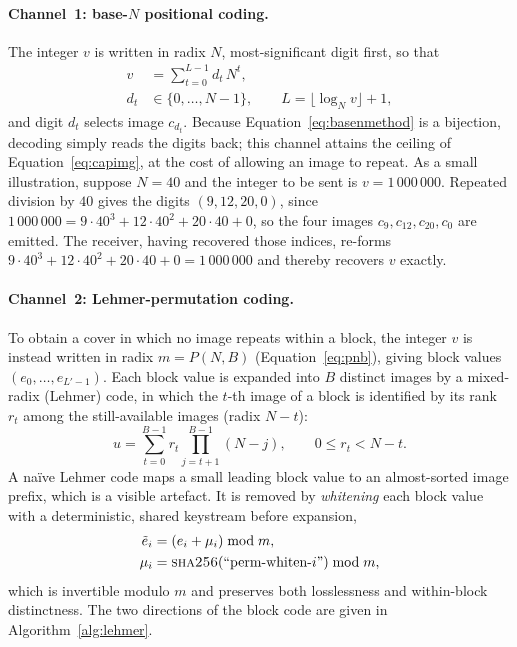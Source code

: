 \documentclass[10pt,a4paper]{article}
\theoremstyle{definition}
\begin{document}
\paragraph{Channel~1: base-$N$ positional coding.}
The integer $v$ is written in radix $N$, most-significant digit first, so that
\begin{equation}
  \begin{aligned}
  v&=\sum_{t=0}^{L-1} d_t\,N^{t},\\
  d_t&\in\{0,\dots,N-1\},\qquad L=\lfloor\log_N v\rfloor+1 ,
  \end{aligned}
  \label{eq:basenmethod}
\end{equation}
and digit $d_t$ selects image $c_{d_t}$. Because Equation~\eqref{eq:basenmethod} is a
bijection, decoding simply reads the digits back; this channel attains the ceiling
of Equation~\eqref{eq:capimg}, at the cost of allowing an image to repeat. As a small
illustration, suppose $N=40$ and the integer to be sent is $v=1\,000\,000$. Repeated
division by $40$ gives the digits $(9,12,20,0)$, since
$1\,000\,000 = 9\cdot40^{3} + 12\cdot40^{2} + 20\cdot40 + 0$, so the four images
$c_9,c_{12},c_{20},c_0$ are emitted. The receiver, having recovered those indices,
re-forms $9\cdot40^{3}+12\cdot40^{2}+20\cdot40+0=1\,000\,000$ and thereby recovers
$v$ exactly.

\paragraph{Channel~2: Lehmer-permutation coding.}
To obtain a cover in which no image repeats within a block, the integer $v$ is
instead written in radix $m=P(N,B)$ (Equation~\eqref{eq:pnb}), giving block values
$(e_0,\dots,e_{L'-1})$. Each block value is expanded into $B$ distinct images by a
mixed-radix (Lehmer) code, in which the $t$-th image of a block is identified by
its rank $r_t$ among the still-available images (radix $N-t$):
\begin{equation}
  u=\sum_{t=0}^{B-1} r_t \!\!\prod_{j=t+1}^{B-1}\!\!(N-j),\qquad 0\le r_t<N-t .
  \label{eq:lehmermethod}
\end{equation}
A na\"ive Lehmer code maps a small leading block value to an almost-sorted image
prefix, which is a visible artefact. It is removed by \emph{whitening} each block
value with a deterministic, shared keystream before expansion,
\begin{equation}
  \begin{aligned}
  \tilde e_i&=\left(e_i+\mu_i\right)\bmod m,\\
  \mu_i&=\textsc{sha256}\!\left(\text{``perm-whiten-}i\text{''}\right)\bmod m ,
  \end{aligned}
  \label{eq:whitenmethod}
\end{equation}
which is invertible modulo $m$ and preserves both losslessness and within-block
distinctness. The two directions of the block code are given in
Algorithm~\ref{alg:lehmer}.
\end{document}
